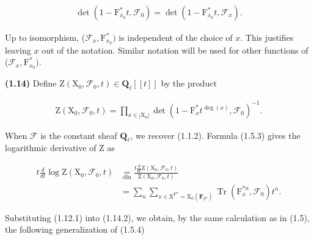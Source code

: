 \documentclass[10pt,leqno]{article}
\begin{document}
\begin{equation*}\begin{gathered}\operatorname{det}(1- \mathrm{F}_{x_{0}}^{*}t,\mathcal{F} _{0}) = \operatorname{det}(1- \mathrm{F}_{x_{0}}^{*}t,\mathcal{F} _{x}).\end{gathered}\end{equation*}

\noindent Up to isomorphism, (\(\mathcal{F} _{x},\mathrm{F}_{x_{0}}^{*})\) is independent of the choice of \(x\). This justifies leaving \(x\) out of the notation. Similar notation will be used for other functions of (\(\mathcal{F} _{x},\mathrm{F}_{x_{0}}^{*})\).\par

\clearpage

\label{physical-8}

\noindent \textbf{(1.14)} Define \(\mathrm{Z}(\mathrm{X}_{0},\mathcal{F} _{0},t)\in \mathbf{Q}_{\ell }[[t]]\) by the product\par

\begin{equation*}\begin{gathered}\mathrm{Z}(\mathrm{X}_{0},\mathcal{F} _{0},t) = \prod _{x\in |\mathrm{X}_{0}|} \operatorname{det}(1- \mathrm{F}_{x}^{*}t^{\operatorname{deg}(x)},\mathcal{F} _{0})^{- 1}.\end{gathered}\tag{1.14.1}\end{equation*}

\noindent When \(\mathcal{F} \) is the constant sheaf \(\mathbf{Q}_{\ell }\), we recover (1.1.2). Formula (1.5.3) gives the logarithmic derivative of \(\mathrm{Z}\) as\par

\begin{equation*}\begin{aligned}
t\frac{d}{dt}\log\mathrm Z(\mathrm X_0,\mathcal F_0,t)
&\underset{\mathrm{dfn}}{=}\frac{t\frac{d}{dt}\mathrm Z(\mathrm X_0,\mathcal F_0,t)}{\mathrm Z(\mathrm X_0,\mathcal F_0,t)}\\
&=\sum_n\sum_{x\in\mathrm X^{\mathrm F^n}=\mathrm X_0(\mathbf F_{q^n})}\operatorname{Tr}(\mathrm F_x^{*n},\mathcal F_0)t^n.
\end{aligned}\tag{1.14.2}\end{equation*}

\noindent Substituting (1.12.1) into (1.14.2), we obtain, by the same calculation as in (1.5), the following generalization of (1.5.4)\par
\end{document}
